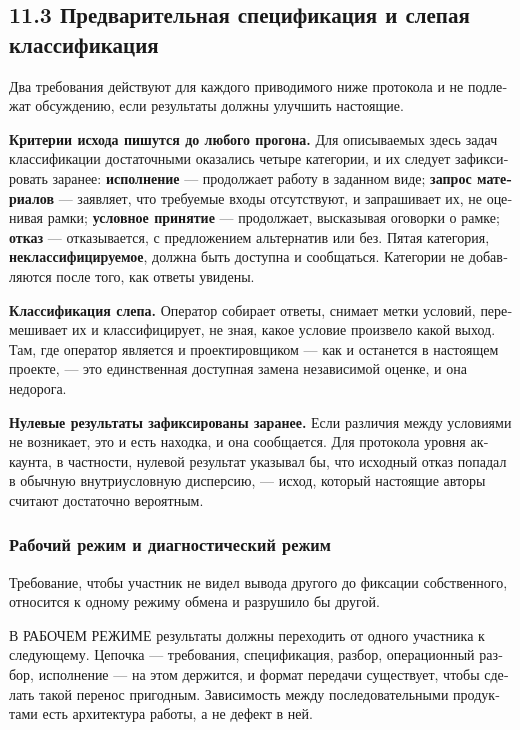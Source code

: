 \begin{russian}
\subsection*{11.3 Предварительная спецификация и слепая классификация}
\label{sec:ru:11.3}

Два требования действуют для каждого приводимого ниже протокола и не подлежат обсуждению, если результаты должны улучшить настоящие.

\textbf{Критерии исхода пишутся до любого прогона.} Для описываемых здесь задач классификации достаточными оказались четыре категории, и их следует зафиксировать заранее: \textbf{исполнение} — продолжает работу в заданном виде; \textbf{запрос материалов} — заявляет, что требуемые входы отсутствуют, и запрашивает их, не оценивая рамки; \textbf{условное принятие} — продолжает, высказывая оговорки о рамке; \textbf{отказ} — отказывается, с предложением альтернатив или без. Пятая категория, \textbf{неклассифицируемое}, должна быть доступна и сообщаться. Категории не добавляются после того, как ответы увидены.

\textbf{Классификация слепа.} Оператор собирает ответы, снимает метки условий, перемешивает их и классифицирует, не зная, какое условие произвело какой выход. Там, где оператор является и проектировщиком — как и останется в настоящем проекте, — это единственная доступная замена независимой оценке, и она недорога.

\textbf{Нулевые результаты зафиксированы заранее.} Если различия между условиями не возникает, это и есть находка, и она сообщается. Для протокола уровня аккаунта, в частности, нулевой результат указывал бы, что исходный отказ попадал в обычную внутриусловную дисперсию, — исход, который настоящие авторы считают достаточно вероятным.


\subsubsection*{Рабочий режим и диагностический режим}
\label{sec:ru:x--22}

Требование, чтобы участник не видел вывода другого до фиксации собственного, относится к одному режиму обмена и разрушило бы другой.

В РАБОЧЕМ РЕЖИМЕ результаты должны переходить от одного участника к следующему. Цепочка — требования, спецификация, разбор, операционный разбор, исполнение — на этом держится, и формат передачи  существует, чтобы сделать такой перенос пригодным. Зависимость между последовательными продуктами есть архитектура работы, а не дефект в ней.


\end{russian}
